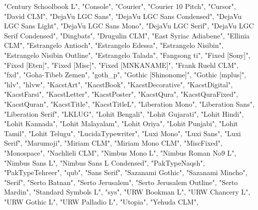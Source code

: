 "Century Schoolbook L", 
"Console", 
"Courier", 
"Courier 10 Pitch",  
"Cursor", 
"David CLM",  
"DejaVu LGC Sans",  
"DejaVu LGC Sans Condensed",  
"DejaVu LGC Sans Light", 
"DejaVu LGC Sans Mono", 
"DejaVu LGC Serif", 
"DejaVu LGC Serif Condensed",  
"Dingbats", 
"Drugulin CLM",  
"East Syriac Adiabene",  
"Ellinia CLM", 
"Estrangelo Antioch",  
"Estrangelo Edessa", 
"Estrangelo Nisibin", 
"Estrangelo Nisibin Outline",  
"Estrangelo Talada", 
"Fangsong ti", 
"Fixed [Sony]", 
"Fixed [Eten]", 
"Fixed [Misc]", 
"Fixed [MNKANAME]", 
"Frank Ruehl CLM", 
"fxd", 
"Goha-Tibeb Zemen",  
"goth\_p", 
"Gothic [Shinonome]",  
"Gothic [mplus]", 
"hlv", 
"hlvw", 
"KacstArt",  
"KacstBook", 
"KacstDecorative", 
"KacstDigital", 
"KacstFarsi", 
"KacstLetter", 
"KacstPoster", 
"KacstQura", 
"KacstQuraFixed",  
"KacstQuran", 
"KacstTitle", 
"KacstTitleL", 
"Liberation Mono",  
"Liberation Sans", 
"Liberation Serif", 
"LKLUG", 
"Lohit Bengali",  
"Lohit Gujarati", 
"Lohit Hindi", 
"Lohit Kannada", 
"Lohit Malayalam", 
"Lohit Oriya", 
"Lohit Punjabi", 
"Lohit Tamil", 
"Lohit Telugu", 
"LucidaTypewriter",  
"Luxi Mono", 
"Luxi Sans", 
"Luxi Serif", 
"Marumoji", 
"Miriam CLM", 
"Miriam Mono CLM",  
"MiscFixed", 
"Monospace", 
"Nachlieli CLM",  
"Nimbus Mono L", 
"Nimbus Roman No9 L",  
"Nimbus Sans L", 
"Nimbus Sans L Condensed",  
"PakTypeNaqsh", 
"PakTypeTehreer", 
"qub", 
"Sans Serif",  
"Sazanami Gothic",  
"Sazanami Mincho", 
"Serif", 
"Serto Batnan",  
"Serto Jerusalem", 
"Serto Jerusalem Outline",  
"Serto Mardin", 
"Standard Symbols L",  
"sys", 
"URW Bookman L",  
"URW Chancery L", 
"URW Gothic L", 
"URW Palladio L", 
"Utopia", 
"Yehuda CLM",  


